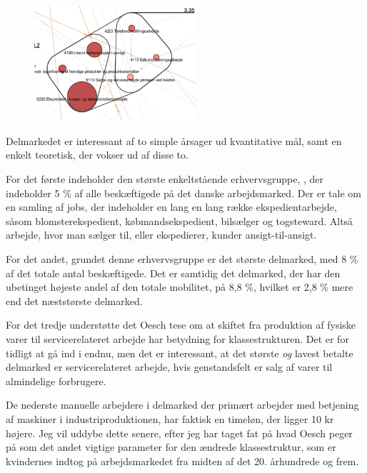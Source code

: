 %
\begin{figure}
  \vspace{-20pt}
  \begin{center}
    \includegraphics[width=6cm]{fig/segzoom/seg_3_35.pdf}
   \caption{}
   \label{fig_delanalyse1_zoom_3_35}
  \end{center}
  \vspace{-20pt}
\end{figure}
%

Delmarkedet er interessant af to simple årsager ud kvantitative mål, samt en enkelt teoretisk, der vokser ud af disse to. 

For det første indeholder den største enkeltstående erhvervsgruppe, ,  der indeholder 5 \% af alle beskæftigede på det danske arbejdsmarked. Der er tale om en samling af jobs, der indeholder en lang en lang række ekspedientarbejde, såsom blomsterekspedient, købmandsekspedient, bilsælger og togsteward. Altså arbejde, hvor man sælger til, eller ekspedierer, kunder ansigt-til-ansigt. 

For det andet, grundet denne erhvervsgruppe er  det største delmarked, med 8 \% af det totale antal beskæftigede. Det er samtidig det delmarked, der har den ubetinget højeste andel af den totale mobilitet, på 8,8 \%, hvilket er 2,8 \% mere end det næststørste delmarked. 

For det tredje understøtte det Oesch tese om at skiftet fra produktion af fysiske varer til servicerelateret arbejde har betydning for klassestrukturen. Det er for tidligt at gå ind i endnu, men det er interessant, at det største \emph{og} lavest betalte delmarked er servicerelateret arbejde, hvis genstandsfelt er salg af varer til almindelige forbrugere. 

De nederste manuelle arbejdere i delmarked  der primært arbejder med betjening af maskiner i industriproduktionen, har faktisk en timeløn, der ligger 10 kr højere. Jeg vil uddybe dette senere, efter jeg har taget fat på hvad Oesch peger på som det andet vigtige parameter for den ændrede klassestruktur, som er kvindernes indtog på arbejdsmarkedet fra midten af det 20. århundrede og frem. 





